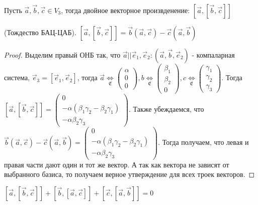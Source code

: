 \begin{definition}
	Пусть $\vec{a}, \vec{b}, \vec{c}\in V_3$, тогда двойное векторное произвденение:
	\([\vec{a}, [\vec{b}, \vec{c}]]\)
\end{definition}
\begin{theorem}
	(Тождество БАЦ-ЦАБ). \([\vec a, [\vec b, \vec c]] = \vec b(\vec a, \vec c) - \vec c(\vec a, \vec b)\)
\end{theorem}

\begin{proof}
	Выделим правый ОНБ так, что \(\vec a || \vec e_1, \vec e_2: (\vec a, \vec b, \vec e_2)\) - компаларная система, \(\vec e_3 = [\vec e_1, \vec e_2]\), тогда \(\vec a\underset{\mathfrak{E}}{\Longleftrightarrow} \begin{pmatrix}
	\alpha \\ 0 \\ 0
	\end{pmatrix}, 
	b\underset{\mathfrak{E}}{\Longleftrightarrow} \begin{pmatrix}
		\beta_1 \\ \beta_2 \\ 0
	\end{pmatrix}, 
	c\underset{\mathfrak{E}}{\Longleftrightarrow} \begin{pmatrix}
		\gamma_1 \\ \gamma_2 \\ \gamma_3
	\end{pmatrix}
	\). \newline Тогда \([\vec a, [\vec b, \vec c]] = \begin{pmatrix}
		0 \\ -\alpha(\beta_1\gamma_2-\beta_2\gamma_1) \\ -\alpha\beta_2\gamma_3
	\end{pmatrix}\). Также убеждаемся, что \(\vec b(\vec a, \vec c) - \vec c(\vec a, \vec b) = \begin{pmatrix}
	0 \\ -\alpha(\beta_1\gamma_2-\beta_2\gamma_1) \\ -\alpha\beta_2\gamma_3
\end{pmatrix}\). Тогда получаем, что левая и правая части дают один и тот же вектор. А так как вектора не зависят от выбранного базиса, то получаем верное утверждение для всех троек векторов.
\end{proof}
\begin{corollary}
	\([\vec a, [\vec b, \vec c]] + [\vec b, [\vec a, \vec c]] + [\vec c, [\vec a, \vec b]] = 0\)
\end{corollary}
